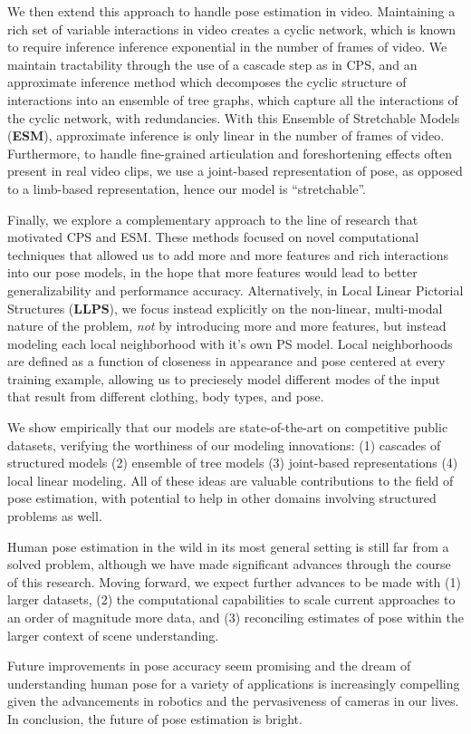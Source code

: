 We then extend this approach to handle pose estimation in video.  Maintaining a 
rich set of variable interactions in video creates a cyclic network, which is 
known to require inference inference exponential in the number of frames of 
video.  We maintain tractability through the use of a cascade step as in CPS, 
and an approximate inference method which decomposes the cyclic structure of 
interactions into an ensemble of tree graphs, which capture all the 
interactions of the cyclic network, with redundancies.  With this Ensemble of 
Stretchable Models ({\bf ESM}), approximate inference is only linear in the 
number of frames of video.  Furthermore, to handle fine-grained articulation 
and foreshortening effects often present in real video clips, we use a 
joint-based representation of pose, as opposed to a limb-based representation, 
hence our model is ``stretchable''.

Finally, we explore a complementary approach to the line of research that 
motivated CPS and ESM.  These methods focused on novel computational techniques 
that allowed us to add more and more features and rich interactions into our 
pose models, in the hope that more features would lead to better 
generalizability and performance accuracy.  Alternatively, in Local Linear 
Pictorial Structures ({\bf LLPS}), we focus instead explicitly on the 
non-linear, multi-modal nature of the problem, {\em not} by introducing more 
and more features, but instead modeling each local neighborhood with it's own 
PS model.  Local neighborhoods are defined as a function of closeness in 
appearance and pose centered at every training example, allowing us to 
preciesely model different modes of the input that result from different 
clothing, body types, and pose.

We show empirically that our models are state-of-the-art on competitive public 
datasets, verifying the worthiness of our modeling innovations: (1) cascades of 
structured models (2) ensemble of tree models (3) joint-based representations 
(4) local linear modeling.  All of these ideas are valuable contributions to 
the field of pose estimation, with potential to help in other domains involving 
structured problems as well.

Human pose estimation in the wild in its most general setting is still far from 
a solved problem, although we have made significant advances through the course 
of this research.  Moving forward, we expect further advances to be made with 
(1) larger datasets, (2) the computational capabilities to scale current 
approaches to an order of magnitude more data, and (3) reconciling estimates of 
pose within the larger context of scene understanding.

Future improvements in pose accuracy seem promising and the dream of 
understanding human pose for a variety of applications is increasingly 
compelling given the advancements in robotics and the pervasiveness of cameras 
in our lives.  In conclusion, the future of pose estimation is bright.
